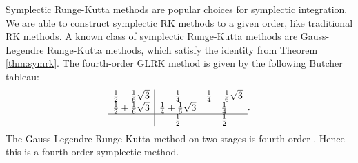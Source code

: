 


Symplectic Runge-Kutta methods are popular choices for symplectic integration.
We are able to construct symplectic RK methods to a given order, like traditional RK methods.
A known class of symplectic Runge-Kutta methods are Gauss-Legendre Runge-Kutta methods, which satisfy the identity from Theorem \ref{thm:symrk}.
The fourth-order GLRK method is given by the following Butcher tableau:
\begin{equation*}
	\begin{array}{c|cc}
		\frac{1}{2} - \frac{1}{6}\sqrt{3}  &\frac{1}{4} &\frac{1}{4} - \frac{1}{6}\sqrt{3} \\
		\frac{1}{2} + \frac{1}{6}\sqrt{3}  &\frac{1}{4} + \frac{1}{6}\sqrt{3} &\frac{1}{4} \\
		\hline
		&\frac{1}{2} &\frac{1}{2}
	\end{array}.
\end{equation*}
The Gauss-Legendre Runge-Kutta method on two stages is fourth order \cite{iserles2009rk}.
Hence this is a fourth-order symplectic method.








